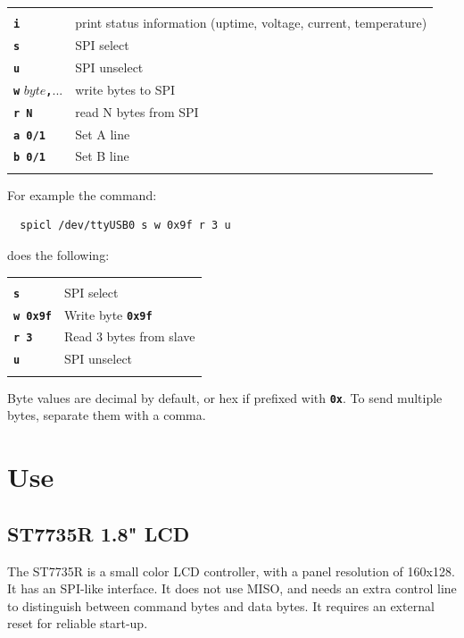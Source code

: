 \documentclass{article}
\newcommand{\mach}[1]{\texttt{\textbf{#1}}}
\newcommand{\gap}{\vspace{10pt}}
\begin{document}
\gap\begin{tabular}{ll}
\hline \\
  \mach{i}     & print status information (uptime, voltage, current, temperature) \\
  \mach{s}     & SPI select \\
  \mach{u}     & SPI unselect \\
  \mach{w} $byte$\mach{,}...     & write bytes to SPI \\
  \mach{r N}   & read N bytes from SPI \\
  \mach{a 0/1} & Set A line \\
  \mach{b 0/1} & Set B line \\
\hline \\
\end{tabular}
\gap

For example the command:

\begin{lstlisting}
  spicl /dev/ttyUSB0 s w 0x9f r 3 u
\end{lstlisting}

does the following:

\gap\begin{tabular}{ll}
\hline \\
 \mach{s}       & SPI select \\
 \mach{w 0x9f}  & Write byte \mach{0x9f} \\
 \mach{r 3}     & Read 3 bytes from slave \\
 \mach{u}       & SPI unselect \\
\hline \\
\end{tabular}

Byte values are decimal by default, or hex if prefixed with \mach{0x}.
To send multiple bytes, separate them with a comma.

\newpage
\section{Use}

\subsection{ST7735R 1.8" LCD}

The ST7735R is a small color LCD controller,
with a panel resolution of 160x128.
It has an SPI-like interface. It does not use MISO, and needs an
extra control line to distinguish between command bytes and data bytes.
It requires an external reset for reliable start-up.
\end{document}
